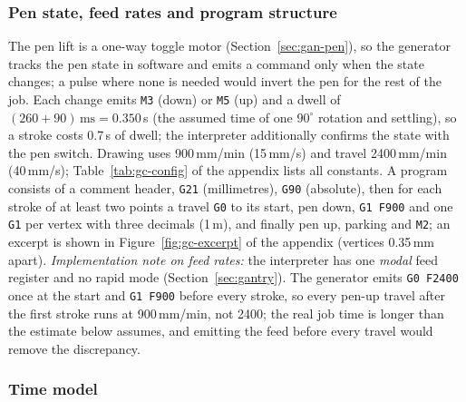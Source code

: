 \subsubsection{Pen state, feed rates and program structure}

The pen lift is a one-way toggle motor (Section~\ref{sec:gan-pen}), so the generator tracks the pen state in software and emits a command only when the state changes; a pulse where none is needed would invert the pen for the rest of the job.
Each change emits \texttt{M3} (down) or \texttt{M5} (up) and a dwell of $(260+90)\,\mathrm{ms}=0.350$\,s (the assumed time of one $90^\circ$ rotation and settling), so a stroke costs 0.7\,s of dwell; the interpreter additionally confirms the state with the pen switch.
Drawing uses 900\,mm/min (15\,mm/s) and travel 2400\,mm/min (40\,mm/s); Table~\ref{tab:gc-config} of the appendix lists all constants.
A program consists of a comment header, \texttt{G21} (millimetres), \texttt{G90} (absolute), then for each stroke of at least two points a travel \texttt{G0} to its start, pen down, \texttt{G1 F900} and one \texttt{G1} per vertex with three decimals (1\,\textmu m), and finally pen up, parking and \texttt{M2}; an excerpt is shown in Figure~\ref{fig:gc-excerpt} of the appendix (vertices 0.35\,mm apart).
\emph{Implementation note on feed rates:} the interpreter has one \emph{modal} feed register and no rapid mode (Section~\ref{sec:gantry}).
The generator emits \texttt{G0 F2400} once at the start and \texttt{G1 F900} before every stroke, so every pen-up travel after the first stroke runs at 900\,mm/min, not 2400; the real job time is longer than the estimate below assumes, and emitting the feed before every travel would remove the discrepancy.

\subsubsection{Time model}

